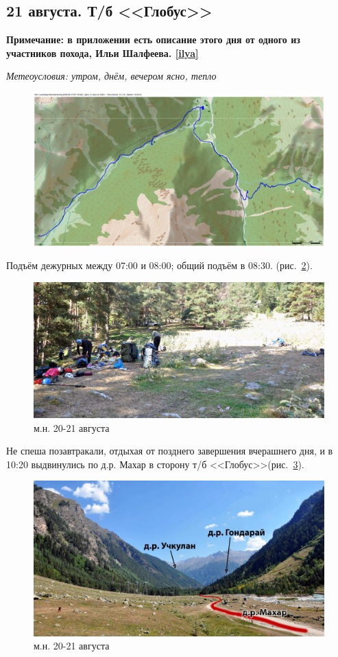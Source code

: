 \subsection{21 августа. Т/б <<Глобус>>}
\textbf{Примечание: в приложении есть описание этого дня от одного из участников похода, Ильи Шалфеева. \ref{ilya}}

\textit{Метеоусловия: утром, днём, вечером ясно, тепло}

\begin{figure}[h!]
	\centering
	\includegraphics[angle=0, width=0.7\linewidth]{../pics/mini_maps/21}
	\label{fig:mini_21}
\end{figure}

Подъём дежурных между 07:00 и 08:00; общий подъём в 08:30. (рис.~\ref{fig:DSC_0993}). 

\begin{figure}[h]
	\centering
	\includegraphics[width=0.7\linewidth]{../pics/DSC_0993}
	\caption{м.н. 20-21 августа}
	\label{fig:DSC_0993}
\end{figure}

Не спеша позавтракали, отдыхая от позднего завершения вчерашнего дня, и в 10:20 выдвинулись по д.р. Махар в сторону т/б <<Глобус>>(рис.~\ref{fig:DSC_1003}). 

\begin{figure}[h]
	\centering
	\includegraphics[width=0.7\linewidth]{../pics/DSC_1003}
	\caption{м.н. 20-21 августа}
	\label{fig:DSC_1003}
\end{figure}

